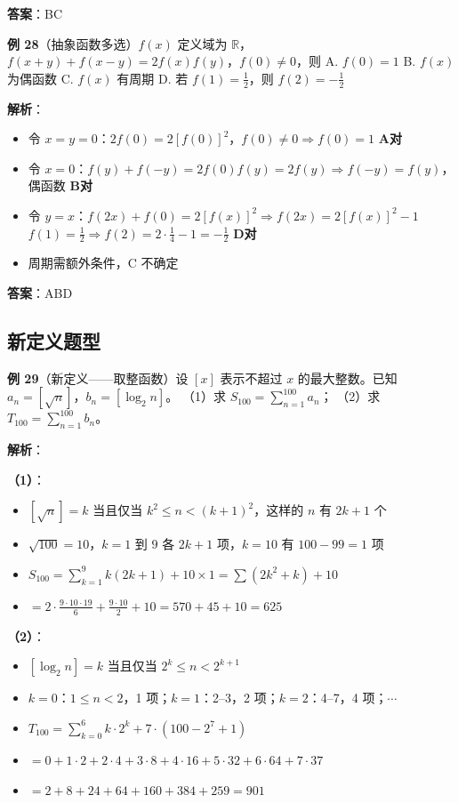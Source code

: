 \textbf{答案}：BC

\textbf{例 28}（抽象函数多选）$f(x)$ 定义域为 $\mathbb{R}$，$f(x+y)+f(x-y)=2f(x)f(y)$，$f(0)\neq0$，则
A. $f(0)=1$ \quad B. $f(x)$ 为偶函数 \quad C. $f(x)$ 有周期 \quad D. 若 $f(1)=\frac12$，则 $f(2)=-\frac12$

\textbf{解析}：
\begin{itemize}
  \item 令 $x=y=0$：$2f(0)=2[f(0)]^2$，$f(0)\neq0\Rightarrow f(0)=1$ \textbf{A对}
  \item 令 $x=0$：$f(y)+f(-y)=2f(0)f(y)=2f(y)\Rightarrow f(-y)=f(y)$，偶函数 \textbf{B对}
  \item 令 $y=x$：$f(2x)+f(0)=2[f(x)]^2\Rightarrow f(2x)=2[f(x)]^2-1$
    $f(1)=\frac12\Rightarrow f(2)=2\cdot\frac14-1=-\frac12$ \textbf{D对}
  \item 周期需额外条件，C 不确定
\end{itemize}

\textbf{答案}：ABD

\subsection{新定义题型}

\textbf{例 29}（新定义——取整函数）设 $[x]$ 表示不超过 $x$ 的最大整数。已知 $a_n=[\sqrt{n}]$，$b_n=[\log_2 n]$。
（1）求 $S_{100}=\sum_{n=1}^{100} a_n$；
（2）求 $T_{100}=\sum_{n=1}^{100} b_n$。

\textbf{解析}：

\textbf{（1）}：
\begin{itemize}
  \item $[\sqrt{n}]=k$ 当且仅当 $k^2\le n < (k+1)^2$，这样的 $n$ 有 $2k+1$ 个
  \item $\sqrt{100}=10$，$k=1$ 到 $9$ 各 $2k+1$ 项，$k=10$ 有 $100-99=1$ 项
  \item $S_{100}=\sum_{k=1}^{9}k(2k+1)+10\times1 = \sum(2k^2+k)+10$
  \item $=2\cdot\frac{9\cdot10\cdot19}{6}+\frac{9\cdot10}{2}+10 = 570+45+10=625$
\end{itemize}

\textbf{（2）}：
\begin{itemize}
  \item $[\log_2 n]=k$ 当且仅当 $2^k\le n < 2^{k+1}$
  \item $k=0$：$1\le n<2$，1 项；$k=1$：2--3，2 项；$k=2$：4--7，4 项；$\cdots$
  \item $T_{100}=\sum_{k=0}^{6}k\cdot2^k + 7\cdot(100-2^7+1)$
  \item $=0+1\cdot2+2\cdot4+3\cdot8+4\cdot16+5\cdot32+6\cdot64 + 7\cdot37$
  \item $=2+8+24+64+160+384+259=901$
\end{itemize}

